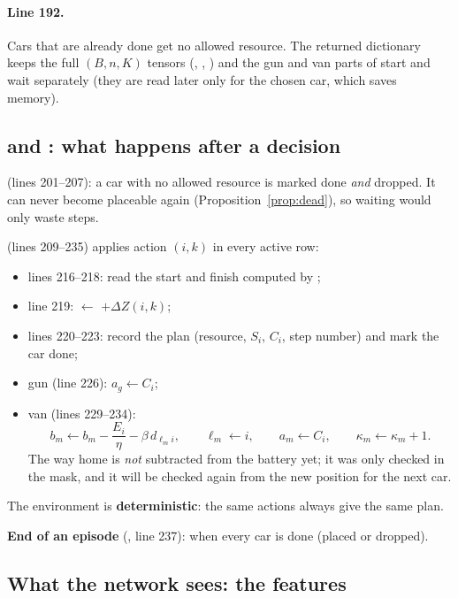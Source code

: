 \paragraph{Line 192.} Cars that are already done get no allowed resource. The returned dictionary keeps the full $(B,n,K)$ tensors (, , ) and the gun and van parts of start and wait separately (they are read later only for the chosen car, which saves memory).

\subsection{ and : what happens after a decision}


\textbf{} (lines 201--207): a car with no allowed resource is marked done \emph{and} dropped. It can never become placeable again (Proposition~\ref{prop:dead}), so waiting would only waste steps.

\textbf{} (lines 209--235) applies action $(i,k)$ in every active row:
\begin{itemize}
  \item lines 216--218: read the start and finish computed by ;
  \item line 219:  $\leftarrow$  $+\Delta Z(i,k)$;
  \item lines 220--223: record the plan (resource, $S_i$, $C_i$, step number) and mark the car done;
  \item gun (line 226): $a_g\leftarrow C_i$;
  \item van (lines 229--234):
  \[
  b_m\leftarrow b_m-\frac{E_i}{\eta}-\beta\,d_{\ell_m i},\qquad \ell_m\leftarrow i,\qquad a_m\leftarrow C_i,\qquad \kappa_m\leftarrow\kappa_m+1 .
  \]
  The way home is \emph{not} subtracted from the battery yet; it was only checked in the mask, and it will be checked again from the new position for the next car.
\end{itemize}
The environment is \textbf{deterministic}: the same actions always give the same plan.

\textbf{End of an episode} (, line 237): when every car is done (placed or dropped).

\subsection{What the network sees: the features}
\label{sec:features}

